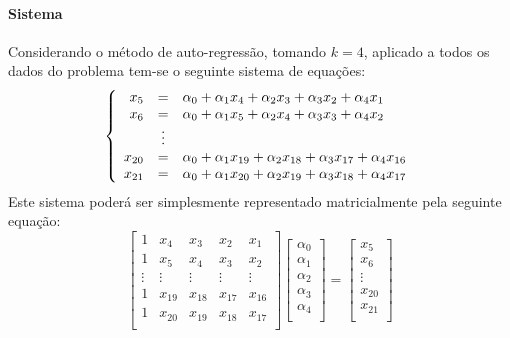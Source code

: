 \documentclass{article}
\begin{document}
            \paragraph{Sistema}Considerando o método de auto-regressão, tomando $k = 4$, aplicado a todos os dados do problema tem-se o seguinte sistema de equações:
                \[
                    \left\{
                    \begin{array}{r c l}
                        x_{5}   & = &\alpha_{0} + \alpha_{1}x_{4} + \alpha_{2}x_{3} + \alpha_{3}x_{2} + \alpha_{4}x_{1}\\
                        x_{6}   & = &\alpha_{0} + \alpha_{1}x_{5} + \alpha_{2}x_{4} + \alpha_{3}x_{3} + \alpha_{4}x_{2}\\
                                & \vdots &\\
                        x_{20}  & = & \alpha_{0} + \alpha_{1}x_{19} + \alpha_{2}x_{18} + \alpha_{3}x_{17} + \alpha_{4}x_{16}\\
                        x_{21}  & = & \alpha_{0} + \alpha_{1}x_{20} + \alpha_{2}x_{19} + \alpha_{3}x_{18} + \alpha_{4}x_{17}\\
                    \end{array}
                    \right.
                \]
            Este sistema poderá ser simplesmente representado matricialmente pela seguinte equação:
                \[
                    \begin{bmatrix}
                        1      & x_{ 4} & x_{ 3} & x_{ 2} & x_{ 1}\\ 
                        1      & x_{ 5} & x_{ 4} & x_{ 3} & x_{ 2}\\ 
                        \vdots & \vdots & \vdots & \vdots & \vdots\\ 
                        1      & x_{19} & x_{18} & x_{17} & x_{16}\\ 
                        1      & x_{20} & x_{19} & x_{18} & x_{17}\\ 
                    \end{bmatrix}
                    \begin{bmatrix}
                        \alpha_{0}\\ \alpha_{1}\\ \alpha_{2}\\ \alpha_{3}\\ \alpha_{4}\\
                    \end{bmatrix} =
                    \begin{bmatrix}
                        x_{5}\\ x_{6}\\ \vdots\\ x_{20}\\ x_{21}\\
                    \end{bmatrix}
                \]
\end{document}
